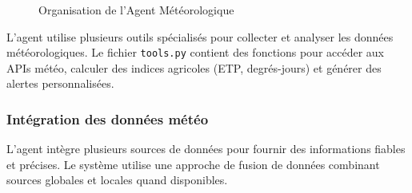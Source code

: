 \begin{figure}[H]
\centering
{}
\caption{Organisation de l'Agent Météorologique}
\end{figure}

L'agent utilise plusieurs outils spécialisés pour collecter et analyser les données météorologiques. Le fichier \texttt{tools.py} contient des fonctions pour accéder aux APIs météo, calculer des indices agricoles (ETP, degrés-jours) et générer des alertes personnalisées.

\subsubsection{Intégration des données météo}

L'agent intègre plusieurs sources de données pour fournir des informations fiables et précises. Le système utilise une approche de fusion de données combinant sources globales et locales quand disponibles.

